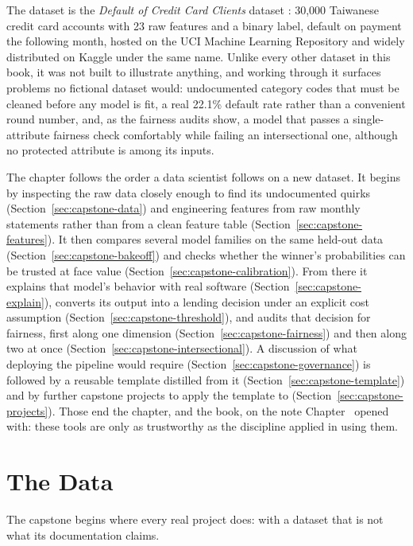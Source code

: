 \documentclass[../ai_in_finance]{subfiles}
\begin{document}
The dataset is the \emph{Default of Credit Card Clients} dataset \parencite{yeh2009comparisons}: 30,000 Taiwanese credit card accounts with 23 raw features and a binary label, default on payment the following month, hosted on the UCI Machine Learning Repository and widely distributed on Kaggle under the same name. Unlike every other dataset in this book, it was not built to illustrate anything, and working through it surfaces problems no fictional dataset would: undocumented category codes that must be cleaned before any model is fit, a real 22.1\% default rate rather than a convenient round number, and, as the fairness audits show, a model that passes a single-attribute fairness check comfortably while failing an intersectional one, although no protected attribute is among its inputs.

The chapter follows the order a data scientist follows on a new dataset. It begins by inspecting the raw data closely enough to find its undocumented quirks (Section~\ref{sec:capstone-data}) and engineering features from raw monthly statements rather than from a clean feature table (Section~\ref{sec:capstone-features}). It then compares several model families on the same held-out data (Section~\ref{sec:capstone-bakeoff}) and checks whether the winner's probabilities can be trusted at face value (Section~\ref{sec:capstone-calibration}). From there it explains that model's behavior with real software (Section~\ref{sec:capstone-explain}), converts its output into a lending decision under an explicit cost assumption (Section~\ref{sec:capstone-threshold}), and audits that decision for fairness, first along one dimension (Section~\ref{sec:capstone-fairness}) and then along two at once (Section~\ref{sec:capstone-intersectional}). A discussion of what deploying the pipeline would require (Section~\ref{sec:capstone-governance}) is followed by a reusable template distilled from it (Section~\ref{sec:capstone-template}) and by further capstone projects to apply the template to (Section~\ref{sec:capstone-projects}). Those end the chapter, and the book, on the note Chapter~ opened with: these tools are only as trustworthy as the discipline applied in using them.

\section{The Data}

The capstone begins where every real project does: with a dataset that is not what its documentation claims.
\end{document}
